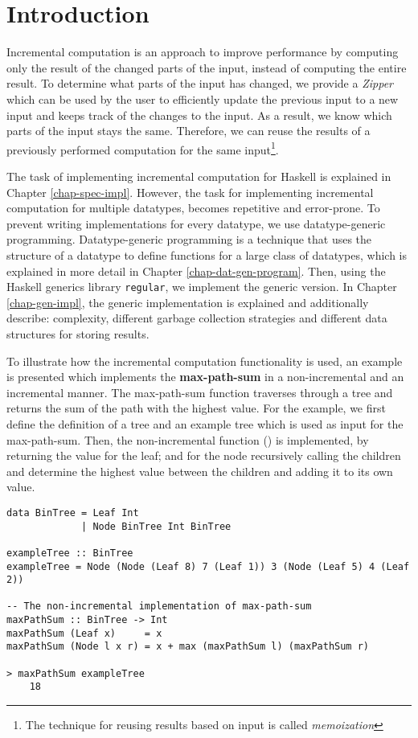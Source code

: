 \chapter{Introduction}


Incremental computation is an approach to improve performance by computing only the result of the changed parts of the input, instead of computing the entire result. To determine what parts of the input has changed, we provide a \textit{Zipper} which can be used by the user to efficiently update the previous input to a new input and keeps track of the changes to the input. As a result, we know which parts of the input stays the same. Therefore, we can reuse the results of a previously performed computation for the same input\footnote{The technique for reusing results based on input is called \textit{memoization}}.   

The task of implementing incremental computation for Haskell is explained in Chapter \ref*{chap-spec-impl}. However, the task for implementing incremental computation for multiple datatypes, becomes repetitive and error-prone. To prevent writing implementations for every datatype, we use datatype-generic programming. Datatype-generic programming is a technique that uses the structure of a datatype to define functions for a large class of datatypes, which is explained in more detail in Chapter \ref*{chap-dat-gen-program}. Then, using the Haskell generics library \texttt{regular}, we implement the generic version. In Chapter \ref*{chap-gen-impl}, the generic implementation is explained and additionally describe: complexity, different garbage collection strategies and different data structures for storing results. 

To illustrate how the incremental computation functionality is used, an example is presented which implements the \textbf{max-path-sum} in a non-incremental and an incremental manner. The max-path-sum function traverses through a tree and returns the sum of the path with the highest value. For the example, we first define the definition of a tree and an example tree which is used as input for the max-path-sum. Then, the non-incremental function () is implemented, by returning the value for the leaf; and for the node recursively calling the children and determine the highest value between the children and adding it to its own value.

\begin{verbatim}
data BinTree = Leaf Int
             | Node BinTree Int BinTree 
             
exampleTree :: BinTree    
exampleTree = Node (Node (Leaf 8) 7 (Leaf 1)) 3 (Node (Leaf 5) 4 (Leaf 2))

-- The non-incremental implementation of max-path-sum
maxPathSum :: BinTree -> Int
maxPathSum (Leaf x)     = x
maxPathSum (Node l x r) = x + max (maxPathSum l) (maxPathSum r)

> maxPathSum exampleTree
    18
\end{verbatim}

